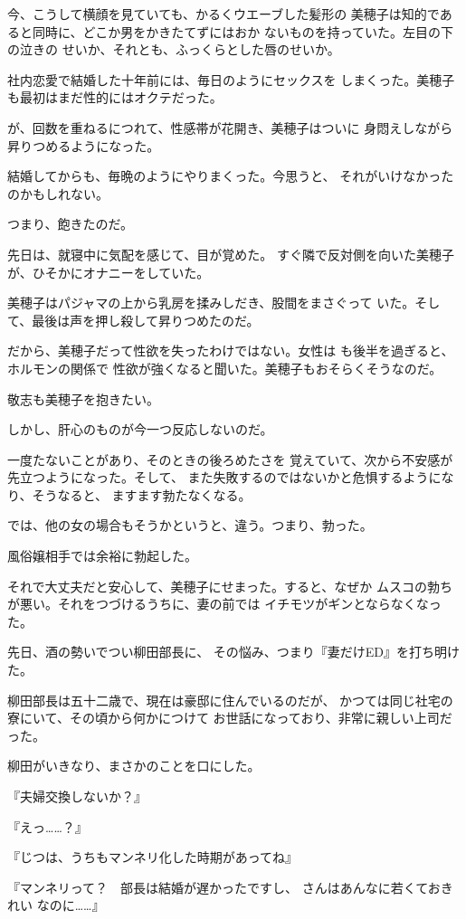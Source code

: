 ﻿\documentclass[
    book,tate,
    line_length=30zw,
    jafontsize=12pt,
    paper=b5j,
    landscape,
    ]{jlreq}
\begin{document}
今、こうして横顔を見ていても、かるくウエーブした髪形の
美穂子は知的であると同時に、どこか男をかきたてずにはおか
ないものを持っていた。左目の下の泣きの
せいか、それとも、ふっくらとした唇のせいか。

社内恋愛で結婚した十年前には、毎日のようにセックスを
しまくった。美穂子も最初はまだ性的にはオクテだった。

が、回数を重ねるにつれて、性感帯が花開き、美穂子はついに
身悶えしながら昇りつめるようになった。

結婚してからも、毎晩のようにやりまくった。今思うと、
それがいけなかったのかもしれない。

つまり、飽きたのだ。

先日は、就寝中に気配を感じて、目が覚めた。
すぐ隣で反対側を向いた美穂子が、ひそかにオナニーをしていた。

美穂子はパジャマの上から乳房を揉みしだき、股間をまさぐって
いた。そして、最後は声を押し殺して昇りつめたのだ。

だから、美穂子だって性欲を失ったわけではない。女性は
も後半を過ぎると、ホルモンの関係で
性欲が強くなると聞いた。美穂子もおそらくそうなのだ。

敬志も美穂子を抱きたい。

しかし、肝心のものが今一つ反応しないのだ。

一度たないことがあり、そのときの後ろめたさを
覚えていて、次から不安感が先立つようになった。そして、
また失敗するのではないかと危惧するようになり、そうなると、
ますます勃たなくなる。

では、他の女の場合もそうかというと、違う。つまり、勃った。

風俗嬢相手では余裕に勃起した。

それで大丈夫だと安心して、美穂子にせまった。すると、なぜか
ムスコの勃ちが悪い。それをつづけるうちに、妻の前では
イチモツがギンとならなくなった。

先日、酒の勢いでつい柳田部長に、
その悩み、つまり『妻だけED』を打ち明けた。

柳田部長は五十二歳で、現在は豪邸に住んでいるのだが、
かつては同じ社宅の寮にいて、その頃から何かにつけて
お世話になっており、非常に親しい上司だった。

柳田がいきなり、まさかのことを口にした。

『夫婦交換しないか？』

『えっ……？』

『じつは、うちもマンネリ化した時期があってね』

『マンネリって？　部長は結婚が遅かったですし、
さんはあんなに若くておきれい
なのに……』
\end{document}

